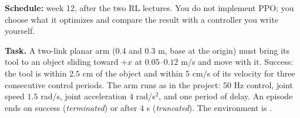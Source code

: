 

\textbf{Schedule:} week 12, after the two RL lectures. You do not implement
PPO; you choose what it optimizes and compare the result with a controller
you write yourself.

\textbf{Task.} A two-link planar arm ($0.4$ and $0.3$ m, base at the origin)
must bring its tool to an object sliding toward $+x$ at $0.05$--$0.12$ m/s and
move with it. Success: the tool is within $2.5$ cm of the object and within
$5$ cm/s of its velocity for three consecutive control periods. The arm runs
as in the project: $50$ Hz control, joint speed $1.5$ rad/s, joint
acceleration $4$ rad/s$^2$, and one period of delay. An episode ends on
success (\emph{terminated}) or after $4$ s (\emph{truncated}). The
environment is .

